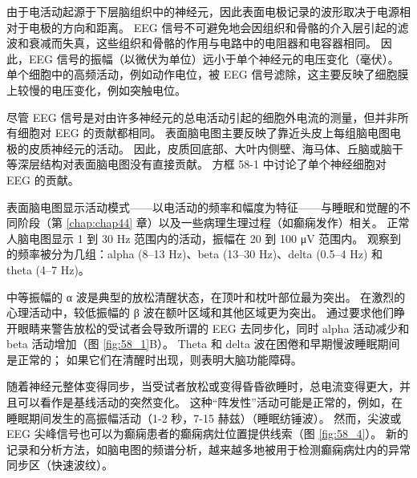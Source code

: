 由于电活动起源于下层脑组织中的神经元，因此表面电极记录的波形取决于电源相对于电极的方向和距离。
EEG 信号不可避免地会因组织和骨骼的介入层引起的滤波和衰减而失真，这些组织和骨骼的作用与电路中的电阻器和电容器相同。
因此，EEG 信号的振幅（以微伏为单位）远小于单个神经元的电压变化（毫伏）。
单个细胞中的高频活动，例如动作电位，被 EEG 信号滤除，这主要反映了细胞膜上较慢的电压变化，例如突触电位。


尽管 EEG 信号是对由许多神经元的总电活动引起的细胞外电流的测量，但并非所有细胞对 EEG 的贡献都相同。
表面脑电图主要反映了靠近头皮上每组脑电图电极的皮质神经元的活动。
因此，皮质回底部、大叶内侧壁、海马体、丘脑或脑干等深层结构对表面脑电图没有直接贡献。
方框 58-1 中讨论了单个神经细胞对 EEG 的贡献。


表面脑电图显示活动模式——以电活动的频率和幅度为特征——与睡眠和觉醒的不同阶段（第 \ref{chap:chap44} 章）以及一些病理生理过程（如癫痫发作）相关。
正常人脑电图显示 1 到 30 Hz 范围内的活动，振幅在 20 到 100 μV 范围内。
观察到的频率被分为几组：alpha (8–13 Hz)、beta (13–30 Hz)、delta (0.5–4 Hz) 和 theta (4–7 Hz)。


中等振幅的 α 波是典型的放松清醒状态，在顶叶和枕叶部位最为突出。
在激烈的心理活动中，较低振幅的 β 波在额叶区域和其他区域更为突出。
通过要求他们睁开眼睛来警告放松的受试者会导致所谓的 EEG 去同步化，同时 alpha 活动减少和 beta 活动增加（图 \ref{fig:58_1}B）。
Theta 和 delta 波在困倦和早期慢波睡眠期间是正常的；
如果它们在清醒时出现，则表明大脑功能障碍。


随着神经元整体变得同步，当受试者放松或变得昏昏欲睡时，总电流变得更大，并且可以看作是基线活动的突然变化。
这种“阵发性”活动可能是正常的，例如，在睡眠期间发生的高振幅活动（1-2 秒，7-15 赫兹）（睡眠纺锤波）。
然而，尖波或 EEG 尖峰信号也可以为癫痫患者的癫痫病灶位置提供线索（图 \ref{fig:58_4}）。
新的记录和分析方法，如脑电图的频谱分析，越来越多地被用于检测癫痫病灶内的异常同步区（快速波纹）。


